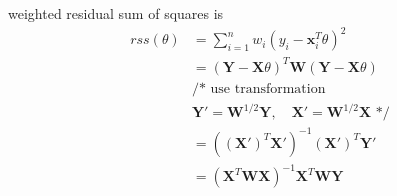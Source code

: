 \documentclass{article}
\begin{document}
weighted residual sum of squares is
\begin{align*}
rss(\theta) &= \sum_{i = 1} ^ n w_i (y_i - \textbf{x}_i ^ T \theta) ^ 2\\
&= (\textbf{Y} - \textbf{X}\theta) ^ T \textbf{W} (\textbf{Y} - \textbf{X}\theta)\\
&\text{/* use transformation }\\
&\textbf{Y}' = \textbf{W} ^ {1 / 2} \textbf{Y},\quad \textbf{X}' = \textbf{W} ^ {1 / 2}\textbf{X} \text{ */}\\
&= ((\textbf{X}') ^ T \textbf{X}') ^ {-1} (\textbf{X}') ^ T \textbf{Y}'\\
&= (\textbf{X} ^ T \textbf{W}\textbf{X}) ^ {-1} \textbf{X} ^ T \textbf{W} \textbf{Y}\\
\end{align*}
\end{document}
